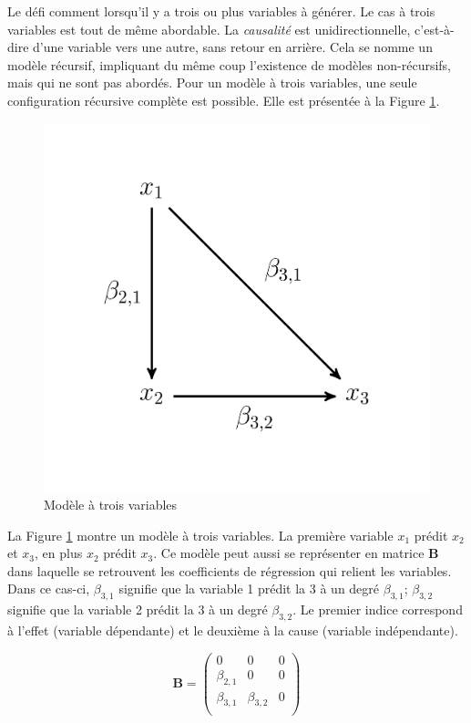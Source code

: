 \documentclass[
]{book}
\begin{document}
Le défi comment lorsqu'il y a trois ou plus variables à générer. Le cas à trois variables est tout de même abordable. La \emph{causalité} est unidirectionnelle, c'est-à-dire d'une variable vers une autre, sans retour en arrière. Cela se nomme un modèle récursif, impliquant du même coup l'existence de modèles non-récursifs, mais qui ne sont pas abordés. Pour un modèle à trois variables, une seule configuration récursive complète est possible. Elle est présentée à la Figure \ref{fig:mod3}.

\begin{figure}

{\centering \includegraphics[width=0.5\linewidth,height=0.5\textheight]{image//mod3} 

}

\caption{Modèle à trois variables}\label{fig:mod3}
\end{figure}

La Figure \ref{fig:mod3} montre un modèle à trois variables. La première variable \(x_1\) prédit \(x_2\) et \(x_3\), en plus \(x_2\) prédit \(x_3\). Ce modèle peut aussi se représenter en matrice \(\mathbf{B}\) dans laquelle se retrouvent les coefficients de régression qui relient les variables. Dans ce cas-ci, \(\beta_{3,1}\) signifie que la variable 1 prédit la 3 à un degré \(\beta_{3,1}\); \(\beta_{3,2}\) signifie que la variable 2 prédit la 3 à un degré \(\beta_{3,2}\). Le premier indice correspond à l'effet (variable dépendante) et le deuxième à la cause (variable indépendante).

\begin{equation}
\mathbf{B} = 
\left( \begin{array}{ccc}
0 & 0 & 0 \\
\beta_{2,1} & 0 & 0 \\
\beta_{3,1} & \beta_{3,2} & 0 \\
\end{array} 
\right)
\label{eq:B}
\end{equation}
\end{document}

